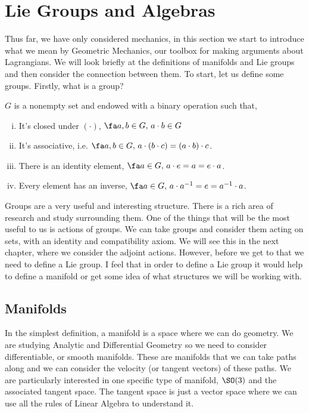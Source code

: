 
\section{Lie Groups and Algebras}

Thus far, we have only considered mechanics, in this section we start to introduce what we mean by Geometric Mechanics, our toolbox for making arguments about Lagrangians. We will look briefly at the definitions of manifolds and Lie groups and then consider the connection between them. To start, let us define some groups. Firstly, what is a group?
\begin{ndefi}[Group]
  $G$ is a nonempty set and endowed with a binary operation such that,
  \begin{enumerate}[(i)]
    \item It's closed under $(\cdot)$, $\fa a, b \in G,\, a \cdot b \in G$
    \item It's associative, i.e. $\fa a, b \in G,\,a \cdot ( b \cdot c) = (a \cdot b) \cdot c$.
    \item There is an identity element, $\fa a \in G,\, a \cdot e = a = e \cdot a$.
    \item Every element has an inverse, $\fa a \in G,\,a \cdot a^{-1} = e = a^{-1} \cdot a$.
  \end{enumerate}
\end{ndefi}

\noindent
Groups are a very useful and interesting structure. There is a rich area of research and study surrounding them. One of the things that will be the most useful to us is actions of groups. We can take groups and consider them acting on sets, with an identity and compatibility axiom. We will see this in the next chapter, where we consider the adjoint actions. However, before we get to that we need to define a Lie group. I feel that in order to define a Lie group it would help to define a manifold or get some idea of what structures we will be working with.

\subsection{Manifolds}
In the simplest definition, a manifold is a space where we can do geometry. We are studying Analytic and Differential Geometry so we need to consider differentiable, or smooth manifolds. These are manifolds that we can take paths along and we can consider the velocity (or tangent vectors) of these paths. We are particularly interested in one specific type of manifold, $\SO(3)$ and the associated tangent space. The tangent space is just a vector space where we can use all the rules of Linear Algebra to understand it. \\

